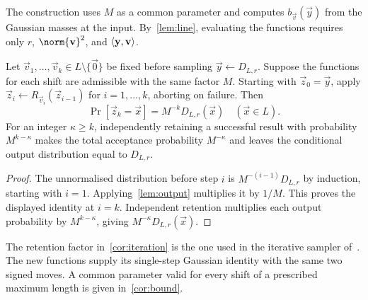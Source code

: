 The construction uses $M$ as a common parameter and computes $b_{\vec v}(\vec y)$ from the Gaussian masses at the input. By~\cref{lem:line}, evaluating the functions requires only $r$, $\norm{\vec v}^2$, and $\langle \mathbf{y},\mathbf{v}\rangle$.

\begin{corollary}
\label{cor:iteration}
Let $\vec v_1,\ldots,\vec v_k\in L\setminus\{\vec0\}$ be fixed before sampling $\vec y\leftarrow D_{L,r}$. Suppose the functions for each shift are admissible with the same factor $M$. Starting with $\vec z_0=\vec y$, apply $\vec z_i\leftarrow R_{\vec v_i}(\vec z_{i-1})$ for $i=1,\ldots,k$, aborting on failure. Then
\[
 \Pr[\vec z_k=\vec x]=M^{-k}D_{L,r}(\vec x)
 \quad(\vec x\in L).
\]
For an integer $\kappa\ge k$, independently retaining a successful result with probability $M^{k-\kappa}$ makes the total acceptance probability $M^{-\kappa}$ and leaves the conditional output distribution equal to $D_{L,r}$.
\end{corollary}
\begin{proof}
The unnormalised distribution before step $i$ is $M^{-(i-1)}D_{L,r}$ by induction, starting with $i=1$. Applying~\cref{lem:output} multiplies it by $1/M$. This proves the displayed identity at $i=k$. Independent retention multiplies each output probability by $M^{k-\kappa}$, giving $M^{-\kappa}D_{L,r}(\vec x)$.
\end{proof}

The retention factor in~\cref{cor:iteration} is the one used in the iterative sampler of~\cite{GartnerFull}. The new functions supply its single-step Gaussian identity with the same two signed moves. A common parameter valid for every shift of a prescribed maximum length is given in~\cref{cor:bound}.
